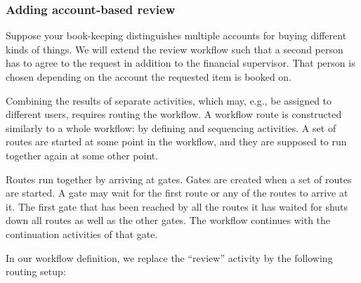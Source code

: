\subsubsection{Adding account-based review}

Suppose your book-keeping distinguishes multiple accounts for buying different
kinds of things. We will extend the review workflow such that a second person
has to agree to the request in addition to the financial supervisor. That
person is chosen depending on the account the requested item is booked on.

Combining the results of separate activities, which may, e.g., be assigned to
different users, requires routing the workflow. A workflow route is
constructed similarly to a whole workflow: by defining and sequencing
activities. A set of routes are started at some point in the workflow, and
they are supposed to run together again at some other point.

Routes run together by arriving at gates. Gates are created when a set of
routes are started. A gate may wait for the first route or any of the routes
to arrive at it. The first gate that has been reached by all the routes it has
waited for shuts down all routes as well as the other gates. The workflow
continues with the continuation activities of that gate.

In our workflow definition, we replace the ``review'' activity by the
following routing setup:

